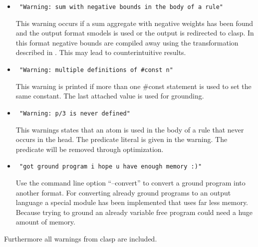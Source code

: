 \documentclass[a4paper,10pt]{article}
\begin{document}
\begin{itemize}
 \item 
\begin{verbatim}
 "Warning: sum with negative bounds in the body of a rule"
\end{verbatim}
This warning occurs if a sum aggregate with negative weights has been found and the output format smodels is used or the output is redirected to clasp. In this format negative bounds are compiled away using the transformation described in \cite{lparseManual}. This may lead to counterintuitive results.
 \item 
\begin{verbatim}
 "Warning: multiple definitions of #const n"
\end{verbatim}
This warning is printed if more than one \#const statement is used to set the same constant.
The last attached value is used for grounding.
\item
\begin{verbatim}
 "Warning: p/3 is never defined"
\end{verbatim}
This warnings states that an atom is used in the body of a rule that never occurs in the head.
The predicate literal is given in the warning. The predicate will be removed through optimization.
\item
\begin{verbatim}
 "got ground program i hope u have enough memory :)"
\end{verbatim}
Use the command line option ``--convert'' to convert a ground program into another format.
For converting already ground programs to an output language a special module has been implemented that uses far less memory. Because trying to ground an already variable free program could need a huge amount of memory.

\end{itemize}
Furthermore all warnings from clasp are included.
\end{document}
